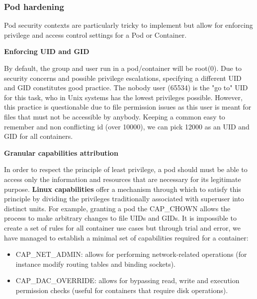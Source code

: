 \documentclass[11pt]{article}
\begin{document}
\vspace{3mm}
\subsubsection{Pod hardening}

\vspace{-5mm}\hspace{5mm} Pod security contexts are particularly tricky to implement but allow for enforcing privilege and access control settings for a Pod or Container. 

\vspace{3mm}
\textbf{Enforcing UID and GID}

By default, the group and user run in a pod/container will be root(0). Due to security concerns and possible privilege escalations, specifying a different UID and GID constitutes good practice. The nobody user (65534) is the "go to" UID for this task, who in Unix systems has the lowest privileges possible. However, this practice is questionable due to file permission issues as this user is meant for files that must not be accessible by anybody. Keeping a common easy to remember and non conflicting id (over 10000), we can pick 12000 as an UID and GID for all containers.

\vspace{3mm}
\textbf{Granular capabilities attribution}

In order to respect the principle of least privilege, a pod should must be able to access only the information and resources that are necessary for its legitimate purpose. \textbf{Linux capabilities} offer a mechanism through which to satisfy this principle by dividing the privileges traditionally associated with superuser into distinct units. For example, granting a pod the CAP\_CHOWN allows the process to make arbitrary changes to file UIDs and GIDs. It is impossible to create a set of rules for all container use cases but through trial and error, we have managed to establish a minimal set of capabilities required for a container:

\begin{itemize}
    \item CAP\_NET\_ADMIN: allows for performing network-related operations (for instance modify routing tables and binding sockets).
    \item CAP\_DAC\_OVERRIDE: allows for bypassing read, write and execution permission checks (useful for containers that require disk operations).
\end{itemize}
\end{document}
